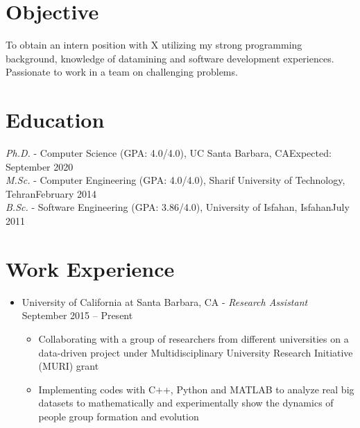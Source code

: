 \documentclass[letter]{res}
\begin{document}
\newif \iflong
\longtrue     %

\address{+1 (805) 886 7101 ~~~ 6520 El Colegio Rd, Apt 2308, Santa Barbara, CA 93106 ~~~ \href{mailto:omid55@cs.ucsb.edu}{omid55@cs.ucsb.edu}}
\begin{resume}
\noindent\makebox[\linewidth]{\rule{\paperwidth}{0.4pt}}


\section{Objective}
To obtain an intern position with X utilizing my strong programming background, knowledge of datamining and software development experiences. Passionate to work in a team on challenging problems.

\section{Education}
{\sl Ph.D.} - Computer Science (GPA: 4.0/4.0), UC Santa Barbara, CA\hfill Expected: September 2020\vspace{-1mm}\\
{\sl M.Sc.} - Computer Engineering (GPA: 4.0/4.0), Sharif University of Technology, Tehran\hfill February 2014\vspace{-1mm}\\
{\sl B.Sc.} - Software Engineering (GPA: 3.86/4.0), University of Isfahan, Isfahan\hfill July 2011\vspace{-1mm}


\section{Work Experience}
\begin{itemize}[leftmargin=-.1in]
\item University of California at Santa Barbara, CA \newline
   - {\sl Research Assistant} \hfill September 2015 – Present\\
   \vspace{-4mm}
   \iflong
     \begin{itemize}
     \item Collaborating with a group of researchers from different universities on a data-driven project under Multidisciplinary University Research Initiative (MURI) grant
     \item Implementing codes with C++, Python and MATLAB to analyze real big datasets to mathematically and experimentally show the dynamics of people group formation and evolution
     \end{itemize}
   \fi 
   

\end{itemize}
\end{resume}
\end{document}
